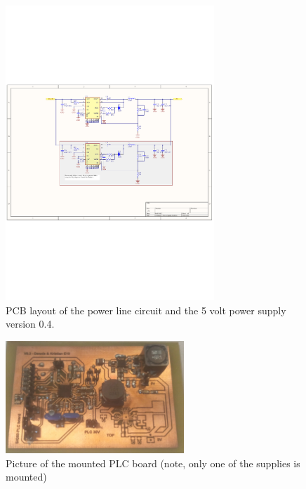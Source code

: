 \begin{figure}[H]
	\begin{centering}
		 \includegraphics[width=0.7\textwidth,page=3,angle=0]{images/SIG60_v0_4}
		\caption{PCB layout of the power line circuit and the 5 volt power supply version 0.4.}
	\end{centering}
\end{figure}

\begin{figure}[H]
	\begin{centering}
		\includegraphics[width=0.6\textwidth,page=1,angle=0]{images/plc_photo_v0_3.jpg}
		\caption{Picture of the mounted PLC board (note, only one of the supplies is mounted)}
		\label{fig:plc_photo_v0_3}
	\end{centering}
\end{figure}

